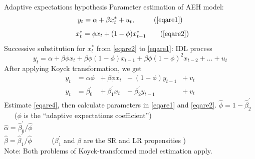 \documentclass{beamer}
\begin{document}
\begin{frame}{Adaptive expectations hypothesis}
Parameter estimation of AEH model:
\begin{equation}
y_t = \alpha + \beta x_t^\ast + u_t,~~ \tag{\ref{eqare1}}
\end{equation}
\begin{equation}
~~x_t^\ast =  \phi x_t + (1-\phi) x^\ast_{t-1} \tag{\ref{eqare2}}
\end{equation}
Successive substitution for $x_t^\ast$ from \eqref{eqare2} to \eqref{eqare1}: IDL process
\begin{equation}
y_t = \alpha + \beta \phi x_{t} 
    + \beta \phi (1-\phi)x_{t-1} + \beta \phi (1 - \phi)^2 x_{t-2} + \dots + u_t \label{eqare3}
 \end{equation}
After applying Koyck transformation, we get
\begin{equation} \label{eqare4}
\begin{aligned}
y_t &= \alpha \phi &+~ \beta \phi x_{t} &+~ (1-\phi) y_{t-1} &+~ v_t \\
y_t &= \beta_0^{\prime} &+~ \beta_1^{\prime} x_{t} &+~ \beta_2^{\prime} y_{t-1} &+~ v_t
\end{aligned}
\end{equation}
Estimate \eqref{eqare4}, then calculate parameters in \eqref{eqare1} and \eqref{eqare2}.
\smallskip
$\hat{\phi}= 1-\hat{\beta}_2^{\prime}$ ~~~($\phi$ is the ``adaptive expectations coefficient'')\\
\smallskip
$\hat{\alpha} =\hat{\beta}_0^{\prime}/\hat{\phi}$\\
\smallskip
$\hat{\beta} =\hat{\beta}_1^{\prime}/\hat{\phi}$ ~~~~~($\beta_1^{\prime}$ and $\beta$ are the SR and LR propensities )\\
\smallskip
\footnotesize{\qquad Note: Both problems of Koyck-transformed model estimation apply.}
\end{frame}
\end{document}
